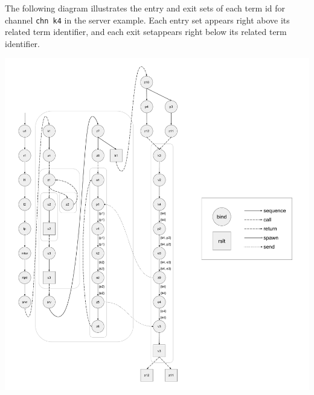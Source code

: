 \documentclass[letterpaper, 11pt]{extarticle}
\begin{document}
The following diagram illustrates the entry and exit sets of each term id
for channel \lstinline{chn k4} in
the server example. Each entry set appears right above its related term identifier,
and each exit setappears right below its related term identifier. 

\includegraphics[width=1\textwidth]{cml-liveness-analysis-k4.pdf}
\end{document}
